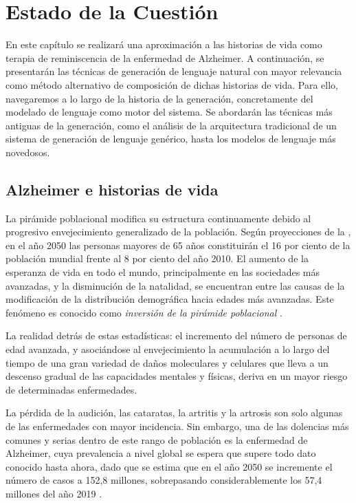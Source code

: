 \chapter{Estado de la Cuestión}
\label{cap:estadoDeLaCuestion}
En este capítulo se realizará una aproximación a las historias de vida como terapia de reminiscencia de la enfermedad de Alzheimer. A continuación, se presentarán las técnicas de generación de lenguaje natural con mayor relevancia como método alternativo de composición de dichas historias de vida. Para ello, navegaremos a lo largo de la historia de la generación, concretamente del modelado de lenguaje como motor del sistema. Se  abordarán las técnicas más antiguas de la generación, como el análisis de la arquitectura tradicional de un sistema de generación de lenguaje genérico, hasta los modelos de lenguaje más novedosos.%

\section{Alzheimer e historias de vida}
La pirámide poblacional modifica su estructura continuamente debido al progresivo envejecimiento generalizado de la población. Según proyecciones de la \cite{alzheimers-association-media-line-2021}, en el año 2050 las personas mayores de 65 años constituirán el 16 por ciento de la población mundial frente al 8 por ciento del año 2010. El aumento de la esperanza de vida en todo el mundo, principalmente en las sociedades más avanzadas, y la disminución de la natalidad, se encuentran entre las causas de la modificación de la distribución demográfica hacia edades más avanzadas. Este fenómeno es conocido como \textit{inversión de la pirámide poblacional} \citep{RCSP892}.

La realidad detrás de estas estadísticas: el incremento del número de personas de edad avanzada, y asociándose al envejecimiento la acumulación a lo largo del tiempo de una gran variedad de daños moleculares y celulares que lleva a un descenso gradual de las capacidades mentales y físicas, deriva en un mayor riesgo de determinadas enfermedades. 

La pérdida de la audición, las cataratas, la artritis y la artrosis son solo algunas de las enfermedades con mayor incidencia. Sin embargo, una de las dolencias más comunes y serias dentro de este rango de población es la enfermedad de Alzheimer, cuya prevalencia a nivel global se espera que supere todo dato conocido hasta ahora, dado que se estima que en el año 2050 se incremente el número de casos a 152,8 millones, sobrepasando considerablemente los 57,4 millones del año 2019 \citep{alzheimers_disease_international_2019}.


